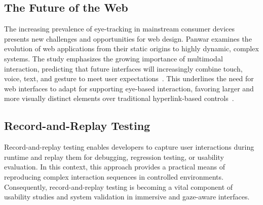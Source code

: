 \subsection{The Future of the Web}

The increasing prevalence of eye-tracking in mainstream consumer devices presents new challenges and opportunities for web design. Panwar examines the evolution of web applications from their static origins to highly dynamic, complex systems. The study emphasizes the growing importance of multimodal interaction, predicting that future interfaces will increasingly combine touch, voice, text, and gesture to meet user expectations~\cite{panwar2024webevolution}. This underlines the need for web interfaces to adapt for supporting eye-based interaction, favoring larger and more visually distinct elements over traditional hyperlink-based controls~\cite{apple2024spatialweb}.


\subsection{Record-and-Replay Testing}

Record-and-replay testing enables developers to capture user interactions during runtime and replay them for debugging, regression testing, or usability evaluation\cite{vasquez2018continuous, moran2016automatically}. In this context, this approach provides a practical means of reproducing complex interaction sequences in controlled environments. Consequently, record-and-replay testing is becoming a vital component of usability studies and system validation in immersive and gaze-aware interfaces.


